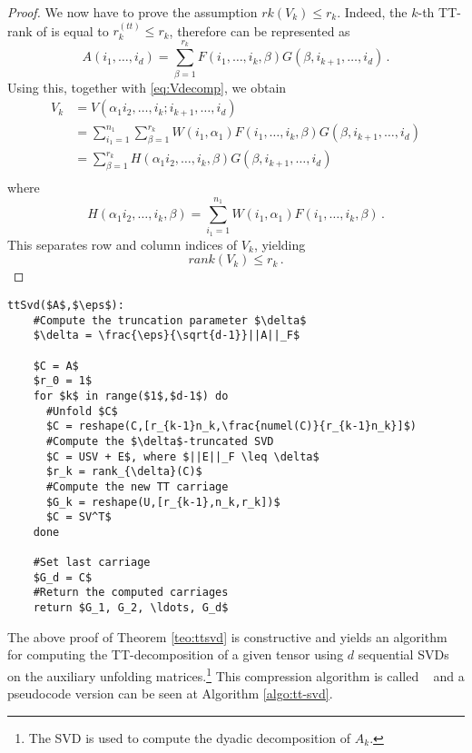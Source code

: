 \begin{Teo}
\begin{proof}
    We now have to prove the assumption $rk(V_k) \leq r_k$. Indeed, the $k$-th TT-rank of \A is equal to $r^{(tt)}_k \leq r_k$, therefore \A can be represented as
    \begin{equation*}
      A(i_1,\ldots,i_d) = \sum_{\beta=1}^{r_k} F(i_1,\ldots,i_k,\beta) G(\beta,i_{k+1},\ldots,i_d)\, .
    \end{equation*}
    Using this, together with \eqref{eq:Vdecomp}, we obtain
    \begin{align*}
      V_k &= V(\alpha_1 i_2,\ldots,i_k;i_{k+1},\ldots,i_d) \\
      &= \sum_{i_1 = 1}^{n_1} \sum_{\beta = 1}^{r_k} W(i_1, \alpha_1) F(i_1,\ldots,i_k,\beta) G(\beta,i_{k+1},\ldots,i_d) \\
      &= \sum_{\beta = 1}^{r_k} H(\alpha_1 i_2,\ldots,i_k,\beta) G(\beta,i_{k+1},\ldots,i_d) \\
    \end{align*}
    where
    \begin{equation*}
      H(\alpha_1 i_2,\ldots,i_k,\beta) = \sum_{i_1 = 1}^{n_1} W(i_1, \alpha_1) F(i_1,\ldots,i_k,\beta)\, .
    \end{equation*}
    This separates row and column indices of $V_k$, yielding
    \begin{equation*}
      rank(V_k) \leq r_k\, .
    \end{equation*}
  \end{proof}
  
\end{Teo}

\begin{lstlisting}[float, caption=TT-SVD compression algorithm, label=algo:tt-svd, title=TT-SVD compression algorithm]
  ttSvd($A$,$\eps$):
    #Compute the truncation parameter $\delta$
    $\delta = \frac{\eps}{\sqrt{d-1}}||A||_F$
  
    $C = A$
    $r_0 = 1$
    for $k$ in range($1$,$d-1$) do
      #Unfold $C$
      $C = reshape(C,[r_{k-1}n_k,\frac{numel(C)}{r_{k-1}n_k}]$)
      #Compute the $\delta$-truncated SVD
      $C = USV + E$, where $||E||_F \leq \delta$
      $r_k = rank_{\delta}(C)$
      #Compute the new TT carriage
      $G_k = reshape(U,[r_{k-1},n_k,r_k])$
      $C = SV^T$
    done
    
    #Set last carriage
    $G_d = C$
    #Return the computed carriages
    return $G_1, G_2, \ldots, G_d$
\end{lstlisting}

The above proof of Theorem \ref{teo:ttsvd} is constructive and yields an algorithm for computing the TT-decomposition of a given tensor using $d$ sequential SVDs on the auxiliary unfolding matrices.\footnote{The SVD is used to compute the dyadic decomposition of $A_k$.} This  compression algorithm is called ~\cite{oseledets2011tt} and a pseudocode version can be seen at Algorithm \ref{algo:tt-svd}.

